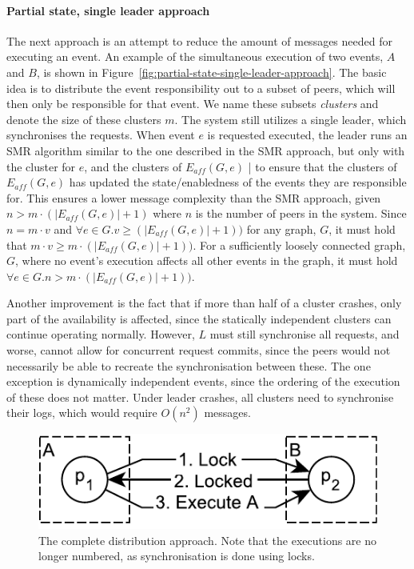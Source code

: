 \documentclass{article}
\begin{document}
	\paragraph{Partial state, single leader approach}
	The next approach is an attempt to reduce the amount of messages needed for executing an event.
    An example of the simultaneous execution of two events, $A$ and $B$, is shown in Figure~\ref{fig:partial-state-single-leader-approach}.
	The basic idea is to distribute the event responsibility out to a subset of peers, which will then only be responsible for that event.
	We name these subsets \textit{clusters} and denote the size of these clusters $m$.
	The system still utilizes a single leader, which synchronises the requests.
	When event $e$ is requested executed, the leader runs an SMR algorithm similar to the one described in the SMR approach, but only with the cluster for $e$, and the clusters of $E_{aff}(G,e)$ | to ensure that the clusters of $E_{aff}(G,e)$ has updated the state/enabledness of the events they are responsible for.
	This ensures a lower message complexity than the SMR approach, given $n > m \cdot (|E_{aff}(G,e)|+1)$ where $n$ is the number of peers in the system.
	Since $n = m \cdot v$ and $\forall e \in G. v \geq (|E_{aff}(G,e)|+1))$ for any graph, $G$, it must hold that $m\cdot v \geq m \cdot (|E_{aff}(G,e)|+1))$.
	For a sufficiently loosely connected graph, $G$, where no event's execution affects all other events in the graph, it must hold $\forall e \in G. n > m \cdot (|E_{aff}(G,e)|+1))$.

	Another improvement is the fact that if more than half of a cluster crashes, only part of the availability is affected, since the statically independent clusters can continue operating normally.
	However, $L$ must still synchronise all requests, and worse, cannot allow for concurrent request commits, since the peers would not necessarily be able to recreate the synchronisation between these.
	The one exception is dynamically independent events, since the ordering of the execution of these does not matter.
	Under leader crashes, all clusters need to synchronise their logs, which would require $O(n^2)$ messages.

    \begin{figure}[ht]
        \center
        \includegraphics[scale=0.7]{figures/dcr-graphs/complete-distribution-approach.pdf}
        \caption{The complete distribution approach.
        Note that the executions are no longer numbered, as synchronisation is done using locks.}
        \label{fig:complete-distribution-approach}
    \end{figure}
    \FloatBarrier
\end{document}
